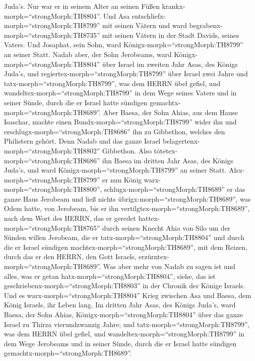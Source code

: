 Juda's. Nur war er in seinem Alter an seinen Füßen
krankx-morph=``strongMorph:TH8804''.  Und Asa
entschliefx-morph=``strongMorph:TH8799'' mit seinen Vätern und ward
begrabenx-morph=``strongMorph:TH8735'' mit seinen Vätern in der Stadt
Davids, seines Vaters. Und Josaphat, sein Sohn, ward
Königx-morph=``strongMorph:TH8799'' an seiner Statt.  Nadab
aber, der Sohn Jerobeams, ward Königx-morph=``strongMorph:TH8804'' über
Israel im zweiten Jahr Asas, des Königs Juda's, und
regiertex-morph=``strongMorph:TH8799'' über Israel zwei Jahre
 und tatx-morph=``strongMorph:TH8799'', was dem HERRN übel
gefiel, und wandeltex-morph=``strongMorph:TH8799'' in dem Wege seines
Vaters und in seiner Sünde, durch die er Israel hatte sündigen
gemachtx-morph=``strongMorph:TH8689''.  Aber Baesa, der
Sohn Ahias, aus dem Hause Isaschar, machte einen
Bundx-morph=``strongMorph:TH8799'' wider ihn und
erschlugx-morph=``strongMorph:TH8686'' ihn zu Gibbethon, welches den
Philistern gehört. Denn Nadab und das ganze Israel
belagertenx-morph=``strongMorph:TH8802'' Gibbethon.  Also
tötetex-morph=``strongMorph:TH8686'' ihn Baesa im dritten Jahr Asas, des
Königs Juda's, und ward Königx-morph=``strongMorph:TH8799'' an seiner
Statt.  Alsx-morph=``strongMorph:TH8799'' er nun König
warx-morph=``strongMorph:TH8800'', schlugx-morph=``strongMorph:TH8689''
er das ganze Haus Jerobeam und ließ nichts
übrigx-morph=``strongMorph:TH8689'', was Odem hatte, von Jerobeam, bis
er ihn vertilgtex-morph=``strongMorph:TH8689'', nach dem Wort des HERRN,
das er geredet hattex-morph=``strongMorph:TH8765'' durch seinen Knecht
Ahia von Silo  um der Sünden willen Jerobeam, die er
tatx-morph=``strongMorph:TH8804'' und durch die er Israel sündigen
machtex-morph=``strongMorph:TH8689'', mit dem Reizen, durch das er den
HERRN, den Gott Israels, erzürntex-morph=``strongMorph:TH8689''.
 Was aber mehr von Nadab zu sagen ist und alles, was er
getan hatx-morph=``strongMorph:TH8804'', siehe, das ist
geschriebenx-morph=``strongMorph:TH8803'' in der Chronik der Könige
Israels.  Und es warx-morph=``strongMorph:TH8804'' Krieg
zwischen Asa und Baesa, dem König Israels, ihr Leben lang. 
Im dritten Jahr Asas, des Königs Juda's, ward Baesa, der Sohn Ahias,
Königx-morph=``strongMorph:TH8804'' über das ganze Israel zu Thirza
vierundzwanzig Jahre;  und
tatx-morph=``strongMorph:TH8799'', was dem HERRN übel gefiel, und
wandeltex-morph=``strongMorph:TH8799'' in dem Wege Jerobeams und in
seiner Sünde, durch die er Israel hatte sündigen
gemachtx-morph=``strongMorph:TH8689''.

